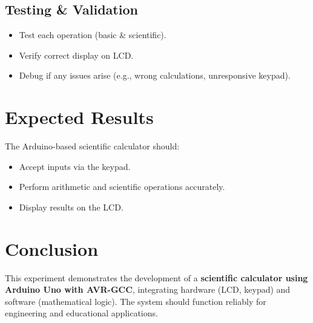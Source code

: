 \documentclass[12pt,a4paper]{article}
\begin{document}
\subsection{Testing \& Validation}
\begin{itemize}
    \item Test each operation (basic \& scientific).
    \item Verify correct display on LCD.
    \item Debug if any issues arise (e.g., wrong calculations, unresponsive keypad).
\end{itemize}

\section*{Expected Results}
The Arduino-based scientific calculator should:
\begin{itemize}
    \item Accept inputs via the keypad.
    \item Perform arithmetic and scientific operations accurately.
    \item Display results on the LCD.
\end{itemize}

\section*{Conclusion}
This experiment demonstrates the development of a \textbf{scientific calculator using Arduino Uno with AVR-GCC}, integrating hardware (LCD, keypad) and software (mathematical logic). The system should function reliably for engineering and educational applications.
\end{document}
